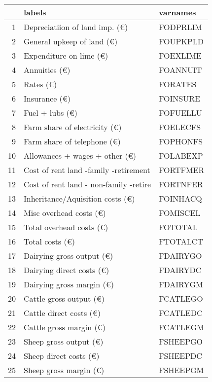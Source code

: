 \documentclass{article}\usepackage{graphicx, color}
\begin{document}
\begin{flushleft}
\newpage
\begin{table}[ht]
\begin{center}
\begin{tabular}{rll}
  \hline
 & labels & varnames \\ 
  \hline
1 & Depreciatiion of land imp.   (€) & FODPRLIM \\ 
  2 & General upkeep of land       (€) & FOUPKPLD \\ 
  3 & Expenditure on lime          (€) & FOEXLIME \\ 
  4 & Annuities                    (€) & FOANNUIT \\ 
  5 & Rates                        (€) & FORATES \\ 
  6 & Insurance                    (€) & FOINSURE \\ 
  7 & Fuel + lubs                  (€) & FOFUELLU \\ 
  8 & Farm share of electricity    (€) & FOELECFS \\ 
  9 & Farm share of telephone      (€) & FOPHONFS \\ 
  10 & Allowances + wages + other   (€) & FOLABEXP \\ 
  11 & Cost of rent land -family -retirement & FORTFMER \\ 
  12 & Cost of rent land - non-family -retire & FORTNFER \\ 
  13 & Inheritance/Aquisition costs (€) & FOINHACQ \\ 
  14 & Misc overhead costs          (€) & FOMISCEL \\ 
  15 & Total overhead costs         (€) & FOTOTAL \\ 
  16 & Total costs                  (€) & FTOTALCT \\ 
  17 & Dairying gross output    (€) & FDAIRYGO \\ 
  18 & Dairying direct costs    (€) & FDAIRYDC \\ 
  19 & Dairying gross margin    (€) & FDAIRYGM \\ 
  20 & Cattle   gross output    (€) & FCATLEGO \\ 
  21 & Cattle   direct costs    (€) & FCATLEDC \\ 
  22 & Cattle   gross margin    (€) & FCATLEGM \\ 
  23 & Sheep    gross output    (€) & FSHEEPGO \\ 
  24 & Sheep    direct costs    (€) & FSHEEPDC \\ 
  25 & Sheep    gross margin    (€) & FSHEEPGM \\ 

\end{tabular}
\end{center}
\end{table}
\end{flushleft}
\end{document}
